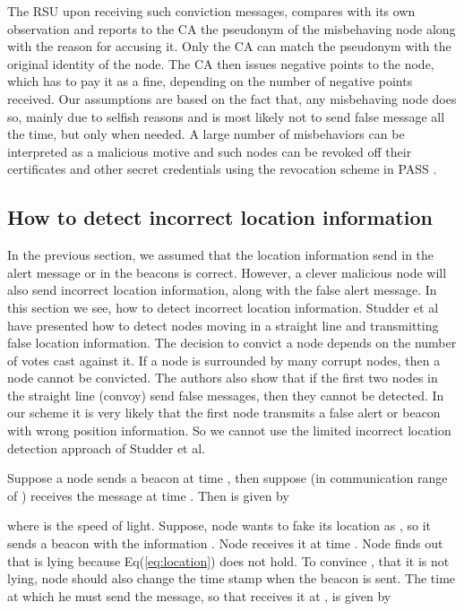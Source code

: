 \documentclass[conference]{IEEEtran}[10pt]
\begin{document}
The RSU upon receiving such conviction messages, compares with its own observation and reports
to the CA the pseudonym of the misbehaving node along with the reason for accusing it.  
Only the CA can match the pseudonym with the original identity of the node. 
The CA then  issues negative points to the node, which has to pay it as a fine, depending on the number of negative points received. 
Our assumptions are based on the fact that, any misbehaving node does so, mainly due to  selfish reasons and is most likely 
not to send false message all the time, but only when needed. 
A large number of misbehaviors can be interpreted as a malicious motive and such nodes can be revoked off their certificates and
other secret credentials using the revocation scheme in PASS \cite{SLLSS10}.  




\subsection{How to detect incorrect location information}
In the previous section, we assumed that the location information send in the alert message or in the beacons is correct.
However, a clever malicious node will also send incorrect location information, along with the false alert message. 
In this section we see, how to detect incorrect location information. 
Studder et al \cite{SLP07} have presented how to detect nodes moving in a straight line  
and transmitting false location information.
The decision to convict a node depends on the number of votes  cast against it. 
If a node is surrounded by many corrupt nodes, then a node cannot be convicted. 
The authors also show that if the first two nodes in the straight line (convoy) send false messages, 
then they cannot be detected. 
In our scheme it is very likely that the first node transmits a false alert or beacon with wrong position information. 
So we cannot use the limited incorrect location detection approach of Studder et al. 

Suppose a node  sends a beacon at time , then suppose  (in communication range of ) receives the message at time . 
Then  is given by 

where  is the speed of light. 
Suppose, node  wants to fake its location as , so it sends a beacon with the information
. Node  receives it at time . 
Node  finds out that  is lying because Eq(\ref{eq:location}) does not hold. 
To convince ,  that it is not lying, node  should also change the time stamp when the beacon is sent. 
The time  at which he must send the
message, so that  receives it at , is given by
\end{document}
